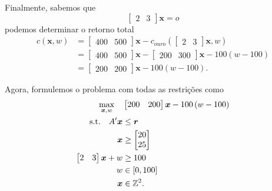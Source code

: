 \documentclass[a4paper]{report}
\begin{document}
Finalmente, sabemos que \[
	\begin{bmatrix} 2 & 3 \end{bmatrix} \bm{x} = o
\]  podemos determinar o retorno total
\begin{align*}
    c\left( \bm{x}, w \right) &= \begin{bmatrix} 400 & 500 \end{bmatrix} \bm{x} - c_{ouro}\left(  \begin{bmatrix} 2 & 3 \end{bmatrix} \bm{x}, w  \right)  \\
    &= \begin{bmatrix} 400 & 500 \end{bmatrix} \bm{x} -\begin{bmatrix} 200 & 300 \end{bmatrix} \bm{x} - 100 \left( w-100 \right)  \\
    &= \begin{bmatrix} 200 & 200 \end{bmatrix} \bm{x} - 100\left( w-100 \right) 
.\end{align*}

Agora, formulemos o problema com todas as restrições como
\begin{align*}
    \max_{\bm{x}, w} \quad & \begin{bmatrix} 200 & 200 \end{bmatrix} \bm{x} -100\left( w-100 \right)  \\
    \textrm{s.t.} \quad A'\bm{x} &\le \bm{r} \\
    \bm{x} &\ge \begin{bmatrix} 20 \\ 25 \end{bmatrix} \\
			\begin{bmatrix} 2 & 3 \end{bmatrix} \bm{x} + w &\ge 100 \\
			w &\in \left[ 0, 100 \right] \\
			\bm{x} &\in \mathbb{Z}^2
.\end{align*}
\end{document}
